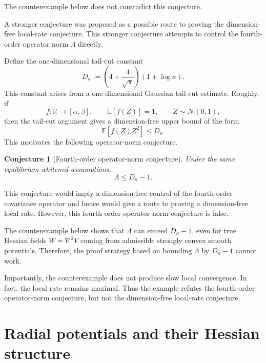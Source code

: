 \documentclass[11pt]{article}
\numberwithin{equation}{section}
\newtheorem{conjecture}[theorem]{Conjecture}
\begin{document}
The counterexample below does not contradict this conjecture.

A stronger conjecture was proposed as a possible route to proving the dimension-free local-rate conjecture. 
This stronger conjecture attempts to control the fourth-order operator norm $\Lambda$ directly.

Define the one-dimensional tail-cut constant
\begin{equation}
    D_\kappa
    :=
    \left(
    4+\frac{4}{\sqrt{\pi}}
    \right)(1+\log\kappa).
\end{equation}
This constant arises from a one-dimensional Gaussian tail-cut estimate. 
Roughly, if
\begin{equation}
    f:\mathbb R\to[\alpha,\beta],
    \qquad
    \mathbb E[f(Z)]=1,
    \qquad
    Z\sim \mathcal N(0,1),
\end{equation}
then the tail-cut argument gives a dimension-free upper bound of the form
\begin{equation}
    \mathbb E[f(Z)Z^2]\le D_\kappa.
\end{equation}
This motivates the following operator-norm conjecture.

\begin{conjecture}[Fourth-order operator-norm conjecture]
Under the same equilibrium-whitened assumptions,
\begin{equation}
    \Lambda
    \le
    D_\kappa-1.
\end{equation}
\end{conjecture}

This conjecture would imply a dimension-free control of the fourth-order covariance operator and hence would give a route to proving a dimension-free local rate. 
However, this fourth-order operator-norm conjecture is false.

The counterexample below shows that $\Lambda$ can exceed $D_\kappa-1$, even for true Hessian fields $W=\nabla^2 V$ coming from admissible strongly convex smooth potentials. 
Therefore, the proof strategy based on bounding $\Lambda$ by $D_\kappa-1$ cannot work.

Importantly, the counterexample does not produce slow local convergence. 
In fact, the local rate remains maximal. 
Thus the example refutes the fourth-order operator-norm conjecture, but not the dimension-free local-rate conjecture.

\section{Radial potentials and their Hessian structure}
\end{document}
